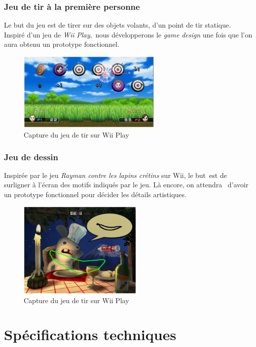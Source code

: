 \documentclass[a4paper]{article}
\begin{document}
\section*{Jeu de tir à la première personne} 
Le but du jeu est de tirer sur des objets volants, d'un point de tir statique. Inspiré d'un jeu de \textit{Wii Play},\
nous développerons le \textit{game design} une fois que l'on aura obtenu un prototype fonctionnel.
\\
\begin{figure}[h!]
\begin{center}\includegraphics[width=7cm]{img/wii.ps}\end{center}
\caption{Capture du jeu de tir sur Wii Play}
\end{figure}

\section*{Jeu de dessin}
Inspirée par le jeu \textit{Rayman contre les lapins crétins} sur Wii, le but\
est de surligner à l'écran des motifs indiqués par le jeu. Là encore, on attendra \
d'avoir un prototype fonctionnel pour décider les détails artistiques. \

\begin{figure}[h!]
\begin{center}\includegraphics[width=6cm]{img/wiidessin.ps}\end{center}
\caption{Capture du jeu de tir sur Wii Play}
\end{figure}

\clearpage

\part{Spécifications techniques}
\end{document}
